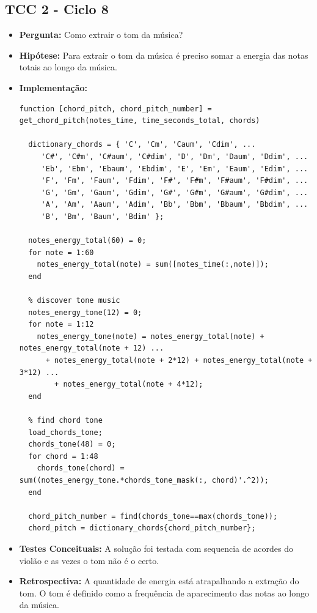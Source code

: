 \subsection{TCC 2 - Ciclo 8}
\begin{itemize}
\item \textbf{Pergunta:} Como extrair o tom da música?
\item \textbf{Hipótese:} Para extrair o tom da música é preciso somar a energia das notas totais ao longo da música.
\item \textbf{Implementação:} 
\begin{lstlisting}function [chord_pitch, chord_pitch_number] = get_chord_pitch(notes_time, time_seconds_total, chords)
  
  dictionary_chords = { 'C', 'Cm', 'Caum', 'Cdim', ...
     'C#', 'C#m', 'C#aum', 'C#dim', 'D', 'Dm', 'Daum', 'Ddim', ...
     'Eb', 'Ebm', 'Ebaum', 'Ebdim', 'E', 'Em', 'Eaum', 'Edim', ...
     'F', 'Fm', 'Faum', 'Fdim', 'F#', 'F#m', 'F#aum', 'F#dim', ...
     'G', 'Gm', 'Gaum', 'Gdim', 'G#', 'G#m', 'G#aum', 'G#dim', ...
     'A', 'Am', 'Aaum', 'Adim', 'Bb', 'Bbm', 'Bbaum', 'Bbdim', ...
     'B', 'Bm', 'Baum', 'Bdim' };

  notes_energy_total(60) = 0;
  for note = 1:60
    notes_energy_total(note) = sum([notes_time(:,note)]);
  end

  % discover tone music
  notes_energy_tone(12) = 0;
  for note = 1:12
    notes_energy_tone(note) = notes_energy_total(note) + notes_energy_total(note + 12) ...
      + notes_energy_total(note + 2*12) + notes_energy_total(note + 3*12) ...
        + notes_energy_total(note + 4*12);
  end

  % find chord tone
  load_chords_tone;
  chords_tone(48) = 0;
  for chord = 1:48
    chords_tone(chord) = sum((notes_energy_tone.*chords_tone_mask(:, chord)'.^2));
  end

  chord_pitch_number = find(chords_tone==max(chords_tone));
  chord_pitch = dictionary_chords{chord_pitch_number};
\end{lstlisting}
\item \textbf{Testes Conceituais:} A solução foi testada com sequencia de acordes do violão e as vezes o tom não é o certo.
\item \textbf{Retrospectiva:} A quantidade de energia está atrapalhando a extração do tom. O tom é definido como a frequência de aparecimento das notas ao longo da música.
\end{itemize}

